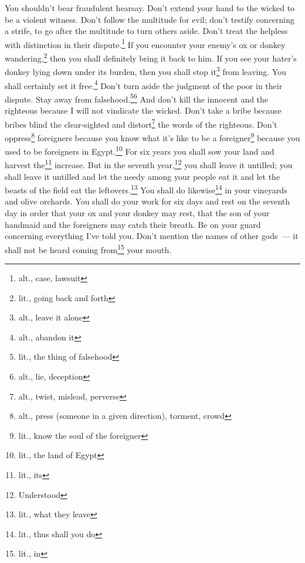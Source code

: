 
\begin{enumerate*}[mode=unboxed]
     You shouldn't bear fraudulent hearsay. Don't extend your hand to the wicked to be a violent witness.%
     Don't follow the multitude for evil; don't testify concerning a strife, to go after the multitude to turn others aside.%
     Don't treat the helpless with distinction in their dispute.\footnote{alt., case, lawsuit}%
     If you encounter your enemy's ox or donkey wandering,\footnote{lit., going back and forth} then you shall definitely bring it back to him.%
     If you see your hater's donkey lying down under its burden, then you shall stop it\footnote{alt., leave it alone} from leaving. You shall certainly set it free.\footnote{alt., abandon it}%
     Don't turn aside the judgment of the poor in their dispute.%
     Stay away from falsehood.\footnote{lit., the thing of falsehood}\footnote{alt., lie, deception} And don't kill the innocent and the righteous because I will not vindicate the wicked.%
     Don't take a bribe because bribes blind the clear-sighted and distort\footnote{alt., twist, mislead, perverse} the words of the righteous.%
     Don't oppress\footnote{alt., press (someone in a given direction), torment, crowd} foreigners because you know what it's like to be a foreigner\footnote{lit., know the soul of the foreigner} because you used to be foreigners in Egypt.\footnote{lit., the land of Egypt}%
     For six years you shall sow your land and harvest the\footnote{lit., its} increase.%
     But in the seventh year,\footnote{Understood} you shall leave it untilled; you shall leave it untilled and let the needy among your people eat it and let the beasts of the field eat the leftovers.\footnote{lit., what they leave} You shall do likewise\footnote{lit., thus shall you do} in your vineyards and olive orchards.%
     You shall do your work for six days and rest on the seventh day in order that your ox and your donkey may rest, that the son of your handmaid and the foreigners may catch their breath.%
     Be on your guard concerning everything I've told you. Don't mention the names of other gods~--- it shall not be heard coming from\footnote{lit., in} your mouth.%

\end{enumerate*}
